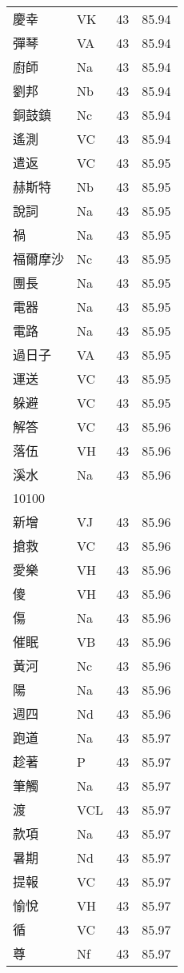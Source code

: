 \documentclass[twocolumn]{book}
\begin{document}
\begin{supertabular}{llrr}
慶幸 & VK & 43 &  85.94\\
彈琴 & VA & 43 &  85.94\\
廚師 & Na & 43 &  85.94\\
劉邦 & Nb & 43 &  85.94\\
銅鼓鎮 & Nc & 43 &  85.94\\
遙測 & VC & 43 &  85.94\\
遣返 & VC & 43 &  85.95\\
赫斯特 & Nb & 43 &  85.95\\
說詞 & Na & 43 &  85.95\\
禍 & Na & 43 &  85.95\\
福爾摩沙 & Nc & 43 &  85.95\\
團長 & Na & 43 &  85.95\\
電器 & Na & 43 &  85.95\\
電路 & Na & 43 &  85.95\\
過日子 & VA & 43 &  85.95\\
運送 & VC & 43 &  85.95\\
躲避 & VC & 43 &  85.95\\
解答 & VC & 43 &  85.96\\
落伍 & VH & 43 &  85.96\\
溪水 & Na & 43 &  85.96\\
10100\\
新增 & VJ & 43 &  85.96\\
搶救 & VC & 43 &  85.96\\
愛樂 & VH & 43 &  85.96\\
傻 & VH & 43 &  85.96\\
傷 & Na & 43 &  85.96\\
催眠 & VB & 43 &  85.96\\
黃河 & Nc & 43 &  85.96\\
陽 & Na & 43 &  85.96\\
週四 & Nd & 43 &  85.96\\
跑道 & Na & 43 &  85.97\\
趁著 & P & 43 &  85.97\\
筆觸 & Na & 43 &  85.97\\
渡 & VCL & 43 &  85.97\\
款項 & Na & 43 &  85.97\\
暑期 & Nd & 43 &  85.97\\
提報 & VC & 43 &  85.97\\
愉悅 & VH & 43 &  85.97\\
循 & VC & 43 &  85.97\\
尊 & Nf & 43 &  85.97\\

\end{supertabular}
\end{document}
